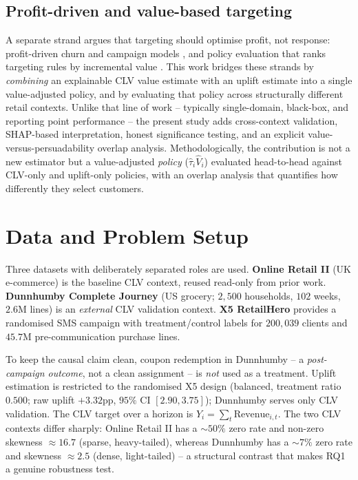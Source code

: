 \documentclass[pdflatex,sn-mathphys-num]{sn-jnl}
\theoremstyle{thmstyleone}
\theoremstyle{thmstylethree}
\begin{document}
\subsection{Profit-driven and value-based targeting}
A separate strand argues that targeting should optimise profit, not response: profit-driven churn
and campaign models \citep{verbeke2012new,lemmens2020managing,gubela2024multiple}, and policy
evaluation that ranks targeting rules by incremental value \citep{hitsch2024heterogeneous}. This work bridges these strands by \emph{combining} an explainable CLV
value estimate with an uplift estimate into a single value-adjusted policy, and by evaluating that
policy across structurally different retail contexts. Unlike that line of work -- typically single-domain, black-box, and reporting point performance -- the present study adds cross-context validation, SHAP-based interpretation, honest significance testing, and an explicit value-versus-persuadability overlap analysis. Methodologically, the contribution is not a new estimator but a value-adjusted \emph{policy} ($\hat\tau_i\hat V_i$) evaluated head-to-head against CLV-only and uplift-only policies, with an overlap analysis that quantifies how differently they select customers.


\section{Data and Problem Setup}\label{sec:data}
Three datasets with deliberately separated roles are used. \textbf{Online Retail II} (UK
e-commerce) is the baseline CLV context, reused read-only from prior work. \textbf{Dunnhumby
Complete Journey} (US grocery; $2{,}500$ households, $102$ weeks, $2.6$M lines) is an \emph{external}
CLV validation context. \textbf{X5 RetailHero} provides a randomised SMS campaign with
treatment/control labels for $200{,}039$ clients and $45.7$M pre-communication purchase lines.

To keep the causal claim clean, coupon redemption in Dunnhumby -- a \emph{post-campaign outcome},
not a clean assignment -- is \emph{not} used as a treatment. Uplift estimation is restricted to
the randomised X5 design (balanced, treatment ratio $0.500$; raw uplift $+3.32$pp, $95\%$ CI
$[2.90,3.75]$); Dunnhumby serves only CLV validation. The CLV target over a horizon is
$Y_i=\sum_{t}\text{Revenue}_{i,t}$. The two CLV contexts differ sharply: Online Retail II has a
$\sim50\%$ zero rate and non-zero skewness $\approx16.7$ (sparse, heavy-tailed), whereas Dunnhumby
has a $\sim7\%$ zero rate and skewness $\approx2.5$ (dense, light-tailed) -- a structural contrast
that makes RQ1 a genuine robustness test.
\end{document}
